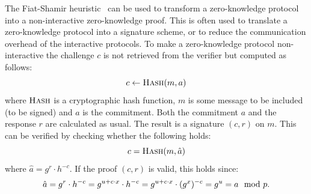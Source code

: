 The Fiat-Shamir heuristic~\cite{FiatShamir1987} can be used to transform a
zero-knowledge protocol into a non-interactive zero-knowledge proof. This is
often used to translate a zero-knowledge protocol into a signature scheme, or to
reduce the communication overhead of the interactive protocols. To make a
zero-knowledge protocol non-interactive the challenge $c$ is not retrieved from
the verifier but computed as follows:
\begin{equation*}
  c \gets \Call{Hash}{m, a}
\end{equation*}
where $\Call{Hash}{}$ is a cryptographic hash function, $m$ is some message to
be included (to be signed) and $a$ is the commitment. Both the commitment $a$
and the response $r$ are calculated as usual. The result is a signature $(c, r)$
on $m$. This can be verified by checking whether the following holds:
\begin{equation*}
  c = \Call{Hash}{m, \hat{a}}
\end{equation*}
where $\hat{a} = g^r \cdot h^{-c}$. If the proof $(c, r)$ is valid, this holds
since:
\begin{equation*}
  \hat{a} = g^r \cdot h^{-c} = g^{u + c \cdot x} \cdot h^{-c} = g^{u + c\cdot x} \cdot (g^x)^{-c} = g^u = a \mod p\text.
\end{equation*}